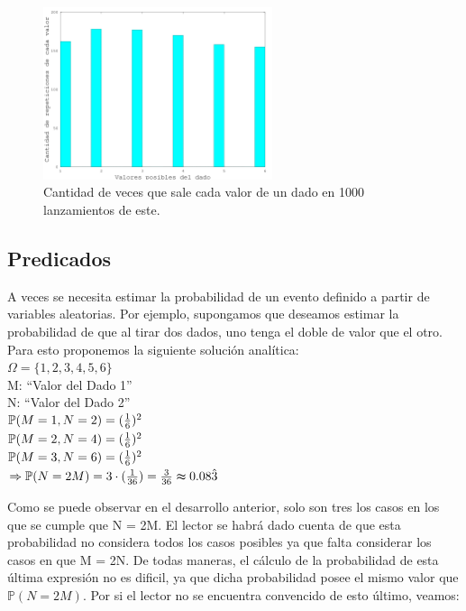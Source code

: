 \documentclass{article}
\begin{document}
\begin{figure}[h]
	\centering
	\includegraphics[width=0.60\textwidth]{images/probabilidadesDados.png}
	\caption{Cantidad de veces que sale cada valor de un dado en 1000 lanzamientos de este.}
\end{figure}
\bigskip



\subsection{Predicados}

A veces se necesita estimar la probabilidad de un evento definido a partir de variables aleatorias. Por ejemplo, supongamos que deseamos estimar la probabilidad de que al tirar dos dados, uno tenga el doble de valor que el otro. Para esto proponemos la siguiente solución analítica:\\

\indent $\Omega = \{1,2,3,4,5,6\}$ \\

\indent M: ``Valor del Dado 1''\\
\indent N: ``Valor del Dado 2''\\

\indent $\mathbb{P}(M=1, N=2) = ({1 \over 6})^2$ \medskip\\
\indent $\mathbb{P}(M=2, N=4) = ({1 \over 6})^2$ \medskip\\
\indent $\mathbb{P}(M=3, N=6) = ({1 \over 6})^2$ \medskip\\

\indent $\Rightarrow \mathbb{P}(N=2M) = 3\cdot({1 \over 36}) = {3 \over 36} \thickapprox 0.08\hat{3}\\$

\noindent Como se puede observar en el desarrollo anterior, solo son tres los casos en los que se cumple que N = 2M. El lector se habrá dado cuenta de que esta probabilidad no considera todos los casos posibles ya que falta considerar los casos en que M = 2N. De todas maneras, el cálculo de la probabilidad de esta última expresión no es dificil, ya que dicha probabilidad posee el mismo valor que $\mathbb{P}(N=2M)$. Por si el lector no se encuentra convencido de esto último, veamos:\\
\end{document}
